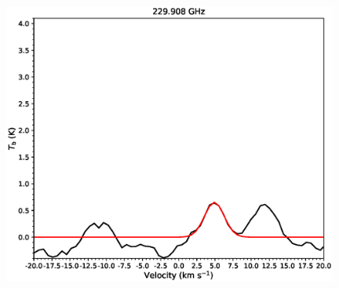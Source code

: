\begin{figure}[htbp]
\begin{center}
\begin{minipage}{0.98\textwidth}
\begin{center}
\begin{minipage}{0.48\textwidth}
\begin{center}
\includegraphics[width=0.98\textwidth]{OrionKL/spectrum/HC/229.908118w_fit.eps}
\end{center}
\end{minipage}
\end{center}
\end{minipage}


\end{center}
\end{figure}
